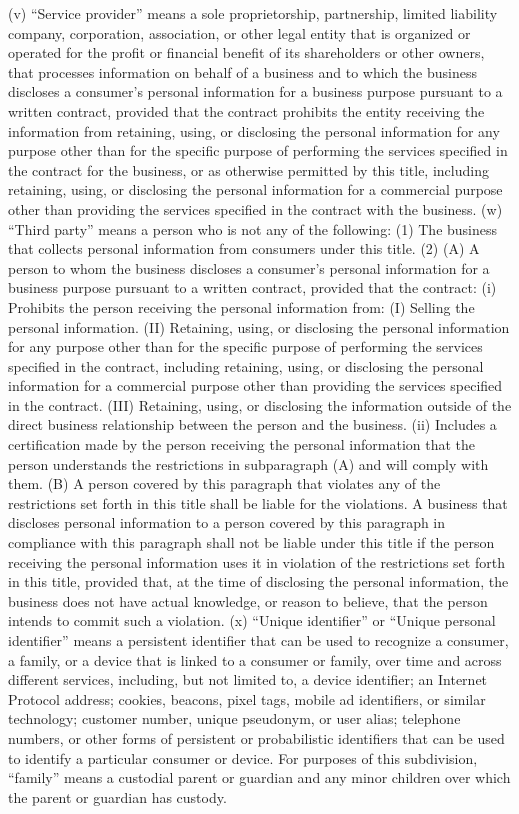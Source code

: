 (v) “Service provider” means a sole proprietorship, partnership, limited liability company, corporation, association, or other legal entity that is organized or operated for the profit or financial benefit of its shareholders or other owners, that processes information on behalf of a business and to which the business discloses a consumer’s personal information for a business purpose pursuant to a written contract, provided that the contract prohibits the entity receiving the information from retaining, using, or disclosing the personal information for any purpose other than for the specific purpose of performing the services specified in the contract for the business, or as otherwise permitted by this title, including retaining, using, or disclosing the personal information for a commercial purpose other than providing the services specified in the contract with the business.
(w) “Third party” means a person who is not any of the following:
(1) The business that collects personal information from consumers under this title.
(2) (A) A person to whom the business discloses a consumer’s personal information for a business purpose pursuant to a written contract, provided that the contract:
(i) Prohibits the person receiving the personal information from:
(I) Selling the personal information.
(II) Retaining, using, or disclosing the personal information for any purpose other than for the specific purpose of performing the services specified in the contract, including retaining, using, or disclosing the personal information for a commercial purpose other than providing the services specified in the contract.
(III) Retaining, using, or disclosing the information outside of the direct business relationship between the person and the business.
(ii) Includes a certification made by the person receiving the personal information that the person understands the restrictions in subparagraph (A) and will comply with them.
(B) A person covered by this paragraph that violates any of the restrictions set forth in this title shall be liable for the violations. A business that discloses personal information to a person covered by this paragraph in compliance with this paragraph shall not be liable under this title if the person receiving the personal information uses it in violation of the restrictions set forth in this title, provided that, at the time of disclosing the personal information, the business does not have actual knowledge, or reason to believe, that the person intends to commit such a violation.
(x) “Unique identifier” or “Unique personal identifier” means a persistent identifier that can be used to recognize a consumer, a family, or a device that is linked to a consumer or family, over time and across different services, including, but not limited to, a device identifier; an Internet Protocol address; cookies, beacons, pixel tags, mobile ad identifiers, or similar technology; customer number, unique pseudonym, or user alias; telephone numbers, or other forms of persistent or probabilistic identifiers that can be used to identify a particular consumer or device. For purposes of this subdivision, “family” means a custodial parent or guardian and any minor children over which the parent or guardian has custody.
